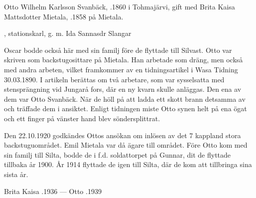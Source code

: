 Otto Wilhelm Karlsson Svanbäck, .1860 i Tohmajärvi, gift med Brita Kaisa Mattsdotter Mietala, .1858 på Mietala.
\begin{jhchildren}
  \item {}
  \item {}
  \item {}
  \item {}
  \item {}, stationskarl, g. m. Ida Sannasdr Slangar
  \item {}
  \item {}
  \item {}
  \item {}
\end{jhchildren}

Oscar bodde också här med sin familj före de flyttade till Silvast. Otto var skriven som backstugosittare på Mietala. Han arbetade som dräng, men också med andra arbeten, vilket framkommer av en tidningsartikel i Wasa Tidning 30.03.1890. I artikeln berättas om två arbetare, som var sysselsatta med stensprängning vid Jungarå fors, där en ny kvarn skulle anläggas. Den ena av dem var Otto Svanbäck. När de höll på att ladda ett skott brann detsamma av och träffade dem i ansiktet. Enligt tidningen miste Otto synen helt på ena ögat och ett finger på vänster hand blev söndersplittrat.

Den 22.10.1920 godkändes Ottos ansökan om inlösen av det 7 kappland stora backstuguområdet. Emil Mietala var då ägare till området. Före Otto kom med sin familj till Silta, bodde de i f.d. soldattorpet på Gunnar, dit de flyttade tillbaka år 1900. År 1914 flyttade de igen till Silta, där de kom att tillbringa sina sista år.

Brita Kaisa .1936  ---  Otto .1939


